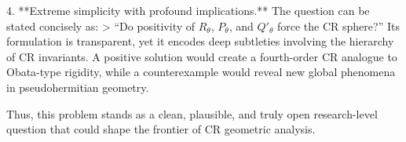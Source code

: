 4. **Extreme simplicity with profound implications.**  
   The question can be stated concisely as:  
   > “Do positivity of \(R_\theta\), \(P_\theta\), and \(Q'_\theta\) force the CR sphere?”  
   Its formulation is transparent, yet it encodes deep subtleties involving the hierarchy of CR invariants. A positive solution would create a fourth-order CR analogue to Obata-type rigidity, while a counterexample would reveal new global phenomena in pseudohermitian geometry.  

Thus, this problem stands as a clean, plausible, and truly open research-level question that could shape the frontier of CR geometric analysis.